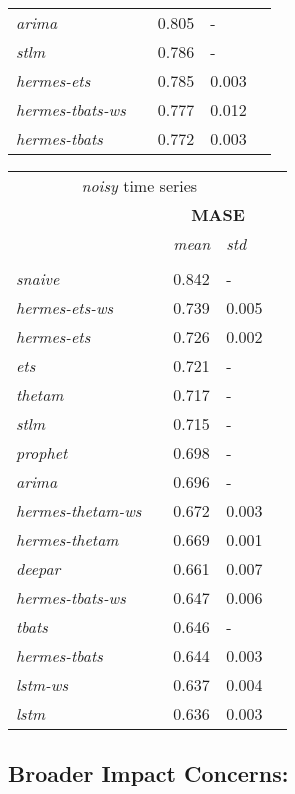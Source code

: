 \documentclass[10pt]{article} %
\begin{document}
\begin{table}
{\begin{tabular}{l||llll}
	 \textit{arima} && 0.805 & -\\ 
	 \textit{stlm} && 0.786 & -\\ 
	 \textit{hermes-ets} && 0.785 & 0.003\\ 
	 \textit{hermes-tbats-ws} && 0.777 & 0.012\\ 
	 \textit{hermes-tbats} && 0.772 & 0.003\\ 
  \end{tabular}\hspace{1cm}
  \begin{tabular}{l||llll}
   \multicolumn{4}{c}{\textit{noisy} time series}\\
   &&\multicolumn{2}{c}{\textbf{MASE}} \\
    &&  \textit{mean}  & \textit{std}  \\
	\hline
	 &&& \\
     \textit{snaive} && 0.842 & -\\ 
	 \textit{hermes-ets-ws} && 0.739 & 0.005\\ 
	 \textit{hermes-ets} && 0.726 & 0.002\\ 
	 \textit{ets} && 0.721 & -\\ 
	 \textit{thetam} && 0.717 & -\\ 
	 \textit{stlm} && 0.715 & -\\ 
	 \textit{prophet} && 0.698 & -\\ 
	 \textit{arima} && 0.696 & -\\ 
	 \textit{hermes-thetam-ws} && 0.672 & 0.003\\ 
	 \textit{hermes-thetam} && 0.669 & 0.001\\ 
	 \textit{deepar} && 0.661 & 0.007\\ 
	 \textit{hermes-tbats-ws} && 0.647 & 0.006\\ 
	 \textit{tbats} && 0.646 & -\\ 
	 \textit{hermes-tbats} && 0.644 & 0.003\\ 
	 \textit{lstm-ws} && 0.637 & 0.004\\ 
	 \textit{lstm} && 0.636 & 0.003\\
  \end{tabular}
 }
 \label{tab:fashionsubsample}
\end{table}
	
\subsection*{Broader Impact Concerns:}	
\end{document}
